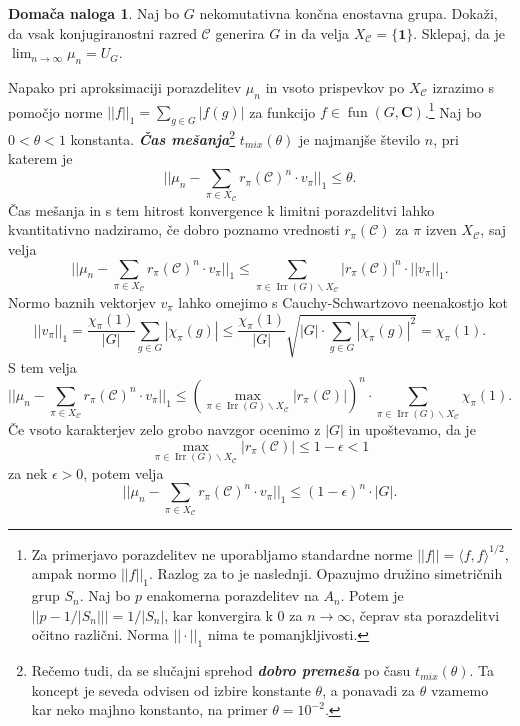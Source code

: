 \documentclass[11pt]{book}
\def\CC{\mathbf{C}}
\def\conclass{\mathcal{C}}
\def\11{\mathbf{1}}
\DeclareMathOperator\Irr{Irr}
\DeclareMathOperator\fun{fun}
\def\definicija{\color{rdeca}\bf\em}
\theoremstyle{definition}
\theoremstyle{zgled}
\theoremstyle{odprtproblem}
\theoremstyle{domacanaloga}
\newtheorem*{domacanaloga}{Domača naloga}
\theoremstyle{izrek}
\begin{document}
\begin{domacanaloga}
Naj bo $G$ nekomutativna končna enostavna grupa. Dokaži, da vsak konjugiranostni razred $\conclass$ generira $G$ in da velja $X_{\conclass} = \{ \11 \}$. Sklepaj, da je $\lim_{n \to \infty} \mu_n = U_G$.
\end{domacanaloga}

Napako pri aproksimaciji porazdelitev $\mu_n$ in vsoto prispevkov po $X_{\conclass}$ izrazimo s pomočjo norme $||f||_1 = \sum_{g \in G} |f(g)|$ za funkcijo $f \in \fun(G,\CC)$.\footnote{Za primerjavo porazdelitev ne uporabljamo standardne norme $||f|| = \langle f, f \rangle^{1/2}$, ampak normo $||f||_1$. Razlog za to je naslednji. Opazujmo družino simetričnih grup $S_n$. Naj bo $p$ enakomerna porazdelitev na $A_n$. Potem je $||p - 1/|S_n||| = 1/|S_n|$, kar konvergira k $0$ za $n \to \infty$, čeprav sta porazdelitvi očitno različni. Norma $||\cdot||_1$ nima te pomanjkljivosti.} Naj bo $0 < \theta < 1$ konstanta. {\definicija Čas mešanja}\footnote{Rečemo tudi, da se slučajni sprehod {\definicija dobro premeša} po času $t_{mix}(\theta)$. Ta koncept je seveda odvisen od izbire konstante $\theta$, a ponavadi za $\theta$ vzamemo kar neko majhno konstanto, na primer $\theta = 10^{-2}$.} $t_{mix}(\theta)$ je  najmanjše število $n$, pri katerem je 
\[
    || \mu_n -  \sum_{\pi \in X_{\conclass}} r_{\pi}(\conclass)^n \cdot v_{\pi} ||_1  \leq \theta.
\]
Čas mešanja in s tem hitrost konvergence k limitni porazdelitvi lahko kvantitativno nadziramo, če dobro poznamo vrednosti $r_{\pi}(\conclass)$ za $\pi$ izven $X_{\conclass}$, saj velja
\[
    || \mu_n -  \sum_{\pi \in X_{\conclass}} r_{\pi}(\conclass)^n \cdot v_{\pi} ||_1
    \leq
    \sum_{\pi \in \Irr(G) \backslash X_{\conclass}} |r_{\pi}(\conclass)|^n \cdot ||v_{\pi}||_1.
\]
Normo baznih vektorjev $v_{\pi}$ lahko omejimo s Cauchy-Schwartzovo neenakostjo kot
\[
    ||v_{\pi}||_1 = \frac{\chi_{\pi}(1)}{|G|} \sum_{g \in G} |\chi_{\pi}(g)|
    \leq \frac{\chi_{\pi}(1)}{|G|} \sqrt{|G| \cdot \sum_{g \in G} |\chi_{\pi}(g)|^2}
    = \chi_{\pi}(1).
\]
S tem velja
\[
    || \mu_n -  \sum_{\pi \in X_{\conclass}} r_{\pi}(\conclass)^n \cdot v_{\pi} ||_1
    \leq \left( \max_{\pi \in \Irr(G) \backslash X_{\conclass}} |r_{\pi}(\conclass)| \right)^n  \cdot \sum_{\pi \in \Irr(G) \backslash X_{\conclass}} \chi_{\pi}(1).
\]
Če vsoto karakterjev zelo grobo navzgor ocenimo z $|G|$ in upoštevamo, da je 
\[
    \max_{\pi \in \Irr(G) \backslash X_{\conclass}} |r_{\pi}(\conclass)|  \leq 1 - \epsilon < 1
\]
za nek $\epsilon > 0$, potem velja
\[
    || \mu_n -  \sum_{\pi \in X_{\conclass}} r_{\pi}(\conclass)^n \cdot v_{\pi} ||_1
    \leq (1 - \epsilon)^n \cdot |G|.
\]
\end{document}
